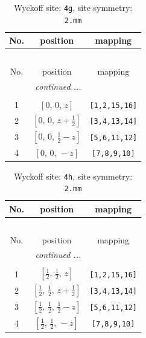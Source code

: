 \documentclass[fleqn,8pt]{jsarticle}
\begin{document}
\renewcommand{\arraystretch}{1.2}
\begin{longtable}{ccc}
\caption{Wyckoff site: {\tt 4g}, site symmetry: {\tt 2.mm}}
 \\
 \hline \hline
No. & position & mapping \\ \hline \endfirsthead

\multicolumn{2}{l}{\tablename\ \thetable{}} \\
 \hline \hline
No. & position & mapping \\ \hline \endhead

 \hline \hline
\multicolumn{2}{r}{\footnotesize\it continued ...} \\ \endfoot

 \hline \hline
\multicolumn{2}{r}{} \\ \endlastfoot

1 & $\left[ 0,\, 0,\, z \right]$ & {\tt [1,2,15,16]} \\ \hline
2 & $\left[ 0,\, 0,\, z + \frac{1}{2} \right]$ & {\tt [3,4,13,14]} \\ \hline
3 & $\left[ 0,\, 0,\, \frac{1}{2} - z \right]$ & {\tt [5,6,11,12]} \\ \hline
4 & $\left[ 0,\, 0,\, - z \right]$ & {\tt [7,8,9,10]} \\
\end{longtable}
\renewcommand{\arraystretch}{1.2}
\begin{longtable}{ccc}
\caption{Wyckoff site: {\tt 4h}, site symmetry: {\tt 2.mm}}
 \\
 \hline \hline
No. & position & mapping \\ \hline \endfirsthead

\multicolumn{2}{l}{\tablename\ \thetable{}} \\
 \hline \hline
No. & position & mapping \\ \hline \endhead

 \hline \hline
\multicolumn{2}{r}{\footnotesize\it continued ...} \\ \endfoot

 \hline \hline
\multicolumn{2}{r}{} \\ \endlastfoot

1 & $\left[ \frac{1}{2},\, \frac{1}{2},\, z \right]$ & {\tt [1,2,15,16]} \\ \hline
2 & $\left[ \frac{1}{2},\, \frac{1}{2},\, z + \frac{1}{2} \right]$ & {\tt [3,4,13,14]} \\ \hline
3 & $\left[ \frac{1}{2},\, \frac{1}{2},\, \frac{1}{2} - z \right]$ & {\tt [5,6,11,12]} \\ \hline
4 & $\left[ \frac{1}{2},\, \frac{1}{2},\, - z \right]$ & {\tt [7,8,9,10]} \\
\end{longtable}
\end{document}
